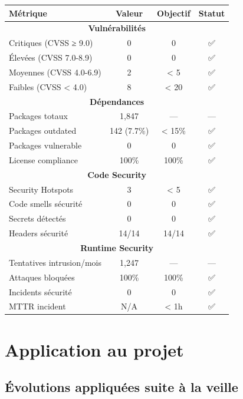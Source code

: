 \begin{tcolorbox}[colback=green!5!white,colframe=green!60!black,title=\textbf{Dashboard sécurité Q4 2025}]
\begin{center}
\begin{tabular}{|l|c|c|c|}
\hline
\textbf{Métrique} & \textbf{Valeur} & \textbf{Objectif} & \textbf{Statut} \\
\hline
\multicolumn{4}{|c|}{\textbf{Vulnérabilités}} \\
\hline
Critiques (CVSS ≥ 9.0) & 0 & 0 & ✅ \\
Élevées (CVSS 7.0-8.9) & 0 & 0 & ✅ \\
Moyennes (CVSS 4.0-6.9) & 2 & < 5 & ✅ \\
Faibles (CVSS < 4.0) & 8 & < 20 & ✅ \\
\hline
\multicolumn{4}{|c|}{\textbf{Dépendances}} \\
\hline
Packages totaux & 1,847 & --- & --- \\
Packages outdated & 142 (7.7\%) & < 15\% & ✅ \\
Packages vulnerable & 0 & 0 & ✅ \\
License compliance & 100\% & 100\% & ✅ \\
\hline
\multicolumn{4}{|c|}{\textbf{Code Security}} \\
\hline
Security Hotspots & 3 & < 5 & ✅ \\
Code smells sécurité & 0 & 0 & ✅ \\
Secrets détectés & 0 & 0 & ✅ \\
Headers sécurité & 14/14 & 14/14 & ✅ \\
\hline
\multicolumn{4}{|c|}{\textbf{Runtime Security}} \\
\hline
Tentatives intrusion/mois & 1,247 & --- & --- \\
Attaques bloquées & 100\% & 100\% & ✅ \\
Incidents sécurité & 0 & 0 & ✅ \\
MTTR incident & N/A & < 1h & ✅ \\
\hline
\end{tabular}
\end{center}
\end{tcolorbox}

\section{Application au projet}

\subsection{Évolutions appliquées suite à la veille}

